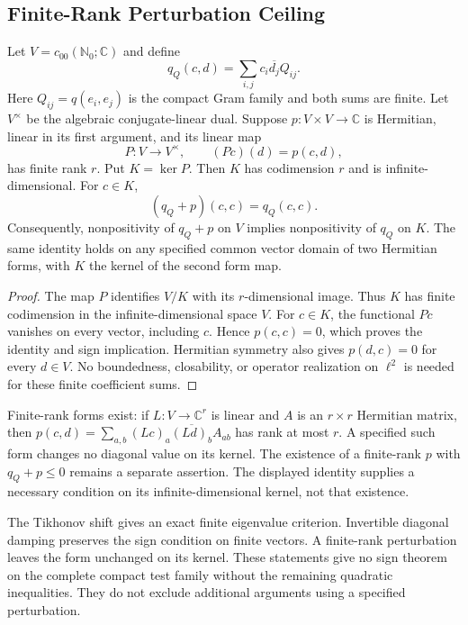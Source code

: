 \subsection{Finite-Rank Perturbation Ceiling}
\label{v4-arith:w7-h:regularizations:finite-rank}

\begin{theorem}
\label{v4-arith:w7-h:thm:finite-rank-ceiling}
Let $V=c_{00}(\mathbb N_0;\mathbb C)$ and define
\[
 q_Q(c,d)=\sum_{i,j}c_i\overline{d_j}Q_{ij}.
\]
Here $Q_{ij}=q(e_i,e_j)$ is the compact Gram family and both sums
are finite. Let $V^\times$ be the algebraic conjugate-linear dual.
Suppose $p:V\times V\to\mathbb C$ is Hermitian, linear in its first
argument, and its linear map
\[
 P:V\to V^\times,\qquad (Pc)(d)=p(c,d),
\]
has finite rank $r$. Put $K=\ker P$.
Then $K$ has codimension $r$ and is infinite-dimensional. For $c\in K$,
\[
 (q_Q+p)(c,c)=q_Q(c,c).
\]
Consequently, nonpositivity of $q_Q+p$ on $V$ implies
nonpositivity of $q_Q$ on $K$.
The same identity holds on any specified common vector domain of
two Hermitian forms, with $K$ the kernel of the second form map.
\end{theorem}
\begin{proof}
The map $P$ identifies $V/K$ with its $r$-dimensional image.
Thus $K$ has finite codimension in the infinite-dimensional space $V$.
For $c\in K$, the functional $Pc$ vanishes on every vector, including
$c$. Hence $p(c,c)=0$, which proves the identity and sign implication.
Hermitian symmetry also gives $p(d,c)=0$ for every $d\in V$.
No boundedness, closability, or operator realization on $\ell^2$
is needed for these finite coefficient sums.
\end{proof}

\begin{remark}
Finite-rank forms exist: if $L:V\to\mathbb C^r$ is linear and
$A$ is an $r\times r$ Hermitian matrix, then
$p(c,d)=\sum_{a,b}(Lc)_a\overline{(Ld)_b}A_{ab}$ has rank at most $r$.
A specified such form changes no diagonal value on its kernel.
The existence of a finite-rank $p$ with $q_Q+p\le0$ remains a
separate assertion. The displayed identity supplies a necessary
condition on its infinite-dimensional kernel, not that existence.
\end{remark}

\begin{remark}
\label{v4-arith:w7-h:rem:three-failures}
The Tikhonov shift gives an exact finite eigenvalue criterion.
Invertible diagonal damping preserves the sign condition on finite
vectors. A finite-rank perturbation leaves the form unchanged on
its kernel. These statements give no sign theorem on the complete
compact test family without the remaining quadratic inequalities.
They do not exclude additional arguments using a specified perturbation.
\end{remark}

